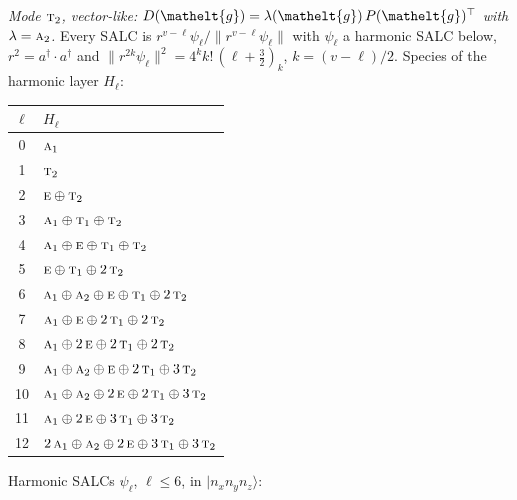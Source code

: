 \documentclass[11pt]{article}
\newcommand{\eltfont}[1]{{\let\sigma\eltsigma\mathelt{#1}}}
\newcommand{\irr}[1]{\text{\normalfont\scshape #1}}
\newcommand{\elt}[1]{\eltfont{#1}}
\newcommand{\occ}[1]{\lvert #1\rangle}
\newcommand{\gel}{\elt{g}}             %
\newcommand{\gmat}{P(\gel)^{\top}}     %
\begin{document}
\emph{Mode $\irr{t}_{2}$, vector-like: $D(\gel)=\lambda(\gel)\,\gmat$ with $\lambda=\irr{a}_{2}$.} Every SALC is $r^{v-\ell}\psi_\ell/\lVert r^{v-\ell}\psi_\ell\rVert$ with $\psi_\ell$ a harmonic SALC below, $r^2=a^\dagger\!\cdot a^\dagger$ and $\lVert r^{2k}\psi_\ell\rVert^2=4^kk!\,(\ell+\tfrac32)_k$, $k=(v-\ell)/2$. Species of the harmonic layer $H_\ell$:
\begin{longtable}{c l}\hline $\ell$ & $H_\ell$\\ \hline\endhead
0 & $\irr{a}_{1}$\\
1 & $\irr{t}_{2}$\\
2 & $\irr{e}\oplus \irr{t}_{2}$\\
3 & $\irr{a}_{1}\oplus \irr{t}_{1}\oplus \irr{t}_{2}$\\
4 & $\irr{a}_{1}\oplus \irr{e}\oplus \irr{t}_{1}\oplus \irr{t}_{2}$\\
5 & $\irr{e}\oplus \irr{t}_{1}\oplus 2\,\irr{t}_{2}$\\
6 & $\irr{a}_{1}\oplus \irr{a}_{2}\oplus \irr{e}\oplus \irr{t}_{1}\oplus 2\,\irr{t}_{2}$\\
7 & $\irr{a}_{1}\oplus \irr{e}\oplus 2\,\irr{t}_{1}\oplus 2\,\irr{t}_{2}$\\
8 & $\irr{a}_{1}\oplus 2\,\irr{e}\oplus 2\,\irr{t}_{1}\oplus 2\,\irr{t}_{2}$\\
9 & $\irr{a}_{1}\oplus \irr{a}_{2}\oplus \irr{e}\oplus 2\,\irr{t}_{1}\oplus 3\,\irr{t}_{2}$\\
10 & $\irr{a}_{1}\oplus \irr{a}_{2}\oplus 2\,\irr{e}\oplus 2\,\irr{t}_{1}\oplus 3\,\irr{t}_{2}$\\
11 & $\irr{a}_{1}\oplus 2\,\irr{e}\oplus 3\,\irr{t}_{1}\oplus 3\,\irr{t}_{2}$\\
12 & $2\,\irr{a}_{1}\oplus \irr{a}_{2}\oplus 2\,\irr{e}\oplus 3\,\irr{t}_{1}\oplus 3\,\irr{t}_{2}$\\
\hline\end{longtable}
Harmonic SALCs $\psi_\ell$, $\ell\le6$, in $\occ{n_xn_yn_z}$:
\end{document}
